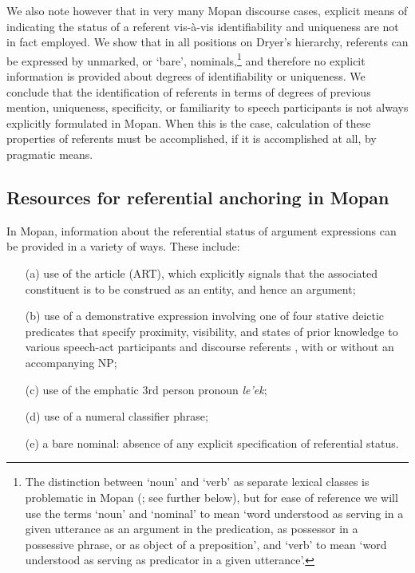 \documentclass[output=paper]{langsci/langscibook}
\begin{document}
{
\hspace*{-1mm}We also note however that in very many Mopan discourse cases, explicit means of indicating the status of a referent vis-\`a-vis identifiability and uniqueness are not in fact employed. We show that in all positions on Dryer's hierarchy, referents can be expressed by unmarked, or `bare', nominals,\footnote{The distinction between `noun' and `verb' as separate lexical classes is problematic in Mopan (\citealt{danziger:08}; see further below), but for ease of reference we will use the terms `noun' and `nominal' to mean `word understood as serving in a given utterance as an argument in the predication, as possessor in a possessive phrase, or as object of a preposition', and `verb' to mean `word understood as serving as predicator in a given utterance'.} and therefore no explicit information is provided about degrees of identifiability or uniqueness. We conclude that the identification of referents in terms of degrees of previous mention, uniqueness, specificity, or familiarity to speech participants is not always explicitly formulated in Mopan. When this is the case, calculation of these properties of referents must be accomplished, if it is accomplished at all, by pragmatic means.
}

\subsection{Resources for referential anchoring in Mopan}\label{3sec:11}
In Mopan, information about the referential status of argument expressions can be provided in a variety of ways. These include:

\begin{itemize}
\setlength\itemsep{-0.1em}
\item[(a)] use of the article (ART), which explicitly signals that the associated constituent is to be construed as an entity, and hence an argument; 
\item[(b)] use of a demonstrative expression involving one of four stative deictic predicates that specify proximity, visibility, and states of prior knowledge to various speech-act participants and discourse referents \citep{danziger:94}, with or without an accompanying NP; 
\item[(c)] use of the emphatic 3rd person pronoun {\emph{le'ek}}; %
\item[(d)] use of a numeral classifier phrase;
\item[(e)] a bare nominal: absence of any explicit specification of referential status. 
\end{itemize}
\end{document}
